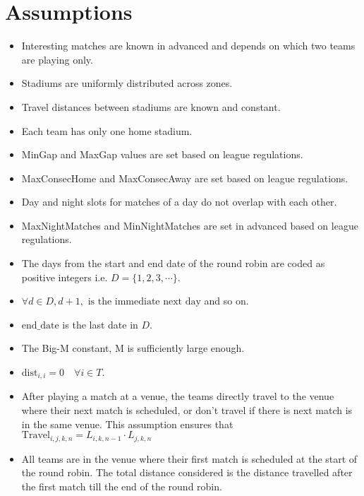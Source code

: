 \documentclass[a4paper, 12pt]{article}
\begin{document}
\section*{Assumptions}
\begin{itemize}
    \item Interesting matches are known in advanced and depends on which two teams are playing only.
    \item Stadiums are uniformly distributed across zones.
    \item Travel distances between stadiums are known and constant.
    \item Each team has only one home stadium.
    \item MinGap and MaxGap values are set based on league regulations.
    \item MaxConsecHome and MaxConsecAway are set based on league regulations.
    \item Day and night slots for matches of a day do not overlap with each other.
    \item MaxNightMatches and MinNightMatches are set in advanced based on league regulations.
    \item The days from the start and end date of the round robin are coded as positive integers i.e. $D = \{1,2,3, \cdots \}$.
    \item $\forall d \in D, d+1, \text{ is the immediate next day}$ and so on. 
    \item $\text{end\_date}$ is the last date in $D$.
    \item The Big-M constant, M is sufficiently large enough.
    \item $\text{dist}_{i,i} = 0 \quad \forall i \in T$.
    \item After playing a match at a venue, the teams directly travel to the venue where their next match is scheduled, or don't travel if there is next match is in the same venue. This assumption ensures that $\text{Travel}_{i,j,k,n} = L_{i,k,n-1}\cdot L_{j,k,n}$
    \item All teams are in the venue where their first match is scheduled at the start of the round robin. The total distance considered is the distance travelled after the first match till the end of the round robin. 
\end{itemize}
\end{document}
